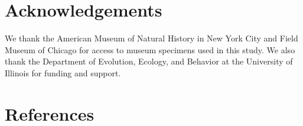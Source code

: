 \documentclass[
  a4paper,
]{article}
\begin{document}
\hypertarget{acknowledgements}{%
\section{Acknowledgements}\label{acknowledgements}}

We thank the American Museum of Natural History in New York City and
Field Museum of Chicago for access to museum specimens used in this
study. We also thank the Department of Evolution, Ecology, and Behavior
at the University of Illinois for funding and support.

\hypertarget{references}{%
\section*{References}\label{references}}
\end{document}
